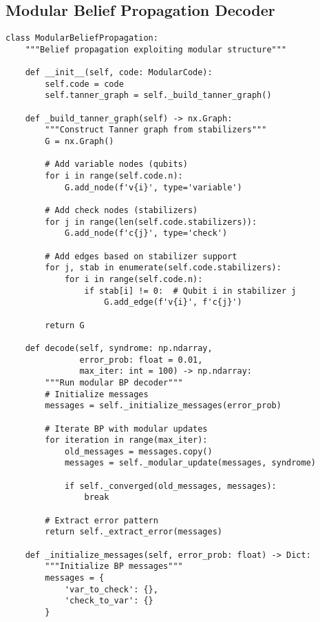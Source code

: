 \documentclass[12pt,a4paper]{article}
\begin{document}
\subsection{Modular Belief Propagation Decoder}

\begin{lstlisting}[style=python,caption=Belief propagation exploiting modular structure]
class ModularBeliefPropagation:
    """Belief propagation exploiting modular structure"""
    
    def __init__(self, code: ModularCode):
        self.code = code
        self.tanner_graph = self._build_tanner_graph()
        
    def _build_tanner_graph(self) -> nx.Graph:
        """Construct Tanner graph from stabilizers"""
        G = nx.Graph()
        
        # Add variable nodes (qubits)
        for i in range(self.code.n):
            G.add_node(f'v{i}', type='variable')
        
        # Add check nodes (stabilizers)
        for j in range(len(self.code.stabilizers)):
            G.add_node(f'c{j}', type='check')
        
        # Add edges based on stabilizer support
        for j, stab in enumerate(self.code.stabilizers):
            for i in range(self.code.n):
                if stab[i] != 0:  # Qubit i in stabilizer j
                    G.add_edge(f'v{i}', f'c{j}')
        
        return G
    
    def decode(self, syndrome: np.ndarray, 
               error_prob: float = 0.01,
               max_iter: int = 100) -> np.ndarray:
        """Run modular BP decoder"""
        # Initialize messages
        messages = self._initialize_messages(error_prob)
        
        # Iterate BP with modular updates
        for iteration in range(max_iter):
            old_messages = messages.copy()
            messages = self._modular_update(messages, syndrome)
            
            if self._converged(old_messages, messages):
                break
        
        # Extract error pattern
        return self._extract_error(messages)
    
    def _initialize_messages(self, error_prob: float) -> Dict:
        """Initialize BP messages"""
        messages = {
            'var_to_check': {},
            'check_to_var': {}
        }
        

\end{lstlisting}
\end{document}
